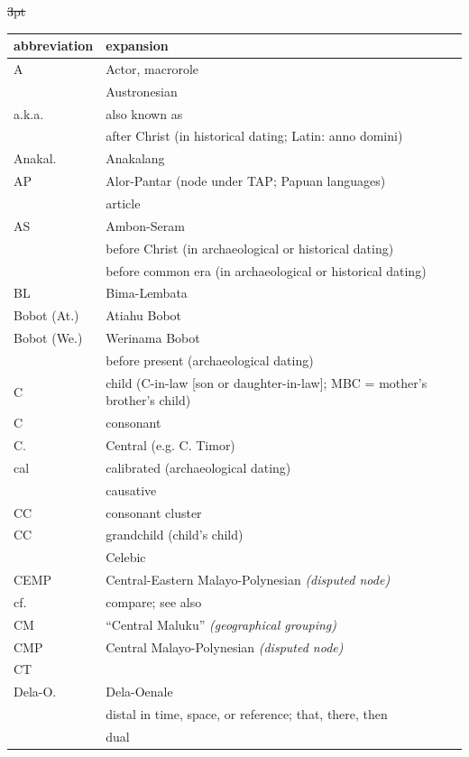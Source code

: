 {\wg\st{3pt}
\begin{xltabular}{\textwidth}[l]{l>{\raggedright\arraybackslash}X}
\lsptoprule			
{abbreviation}	&	{expansion}	\\	\midrule
\endhead
A	&	Actor, macrorole	\\
 & Austronesian \\
a.k.a.	&	also known as	\\
	&	after Christ (in historical dating; Latin: anno domini)	\\
Anakal.	&	Anakalang	\\
AP	&	Alor-Pantar (node under TAP; Papuan languages)	\\
	&	article	\\
AS	&	Ambon-Seram	\\
	&	before Christ (in archaeological or historical dating)	\\
	&	before common era (in archaeological or historical dating)	\\
BL	&	Bima-Lembata	\\
Bobot (At.)	&	Atiahu Bobot	\\
Bobot (We.)	&	Werinama Bobot	\\
	&	before present (archaeological dating)	\\
C	&	child (C-in-law [son or daughter-in-law]; MBC = mother’s brother’s child)	\\
C	&	consonant	\\
C.	&	Central (e.g. C. Timor)	\\
cal	&	calibrated (archaeological dating)	\\
	&	causative	\\
CC	&	consonant cluster	\\
CC	&	grandchild (child's child)	\\
	&	Celebic	\\
CEMP	&	Central-Eastern Malayo-Polynesian \it{(disputed node)}	\\
cf.	&	compare; see also	\\
CM	&	“Central Maluku” \it{(geographical grouping)}	\\
CMP	&	Central Malayo-Polynesian \it{(disputed node)}	\\
CT	&		\\
Dela-O.	&	Dela-Oenale	\\
	&	distal in time, space, or reference; that, there, then	\\
	&	dual	\\

\end{xltabular}}
